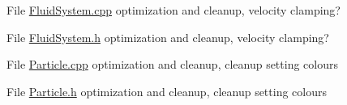 \label{todo__todo000003}
\hypertarget{todo__todo000003}{}
 
\begin{DoxyDescription}
\item[File \hyperlink{FluidSystem_8cpp}{FluidSystem.cpp} ]optimization and cleanup, velocity clamping? 
\end{DoxyDescription}

\label{todo__todo000001}
\hypertarget{todo__todo000001}{}
 
\begin{DoxyDescription}
\item[File \hyperlink{FluidSystem_8h}{FluidSystem.h} ]optimization and cleanup, velocity clamping? 
\end{DoxyDescription}

\label{todo__todo000004}
\hypertarget{todo__todo000004}{}
 
\begin{DoxyDescription}
\item[File \hyperlink{Particle_8cpp}{Particle.cpp} ]optimization and cleanup, cleanup setting colours 
\end{DoxyDescription}

\label{todo__todo000002}
\hypertarget{todo__todo000002}{}
 
\begin{DoxyDescription}
\item[File \hyperlink{Particle_8h}{Particle.h} ]optimization and cleanup, cleanup setting colours 
\end{DoxyDescription}